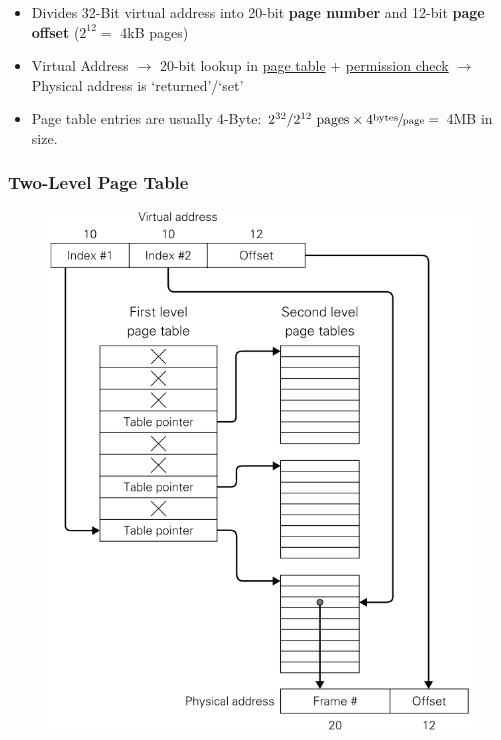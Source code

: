 \documentclass[
  10pt,
  a4paper,
]{article}
\providecommand{\tightlist}{%
  \setlength{\itemsep}{0pt}\setlength{\parskip}{0pt}}\usepackage{longtable,booktabs,array}
\begin{document}
\begin{multicols*}{2}
{\small

\begin{itemize}
\tightlist
\item
  Divides 32-Bit virtual address into 20-bit \textbf{page number} and
  12-bit \textbf{page offset} (\(2^{12}=\) 4kB pages)
\item
  Virtual Address \(\rightarrow\) 20-bit lookup in \ul{page table} +
  \ul{permission check} \(\rightarrow\) Physical address is
  `returned'/`set'
\item
  Page table entries are usually 4-Byte:
  \(2^{32}/2^{12}\text{ pages}\times 4\sfrac{\text{bytes}}{\text{page}}=\)
  4MB in size.
\end{itemize}

}

\subsubsection{Two-Level Page Table}\label{two-level-page-table}

\begin{figure}[H]

{\centering \includegraphics{images/performance/image-23.png}

}
\end{figure}
\end{multicols*}
\end{document}
